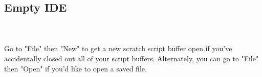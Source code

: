 


\subsection{Empty IDE}

\begin{minipage}{\linewidth}
        
        \label{fig:IDEempty} 
\end{minipage}

~\\~\\ 
Go to "File" then "New" to get a new scratch script buffer open if you've accidentally closed out all of your script buffers. Alternately, you can go to "File" then "Open" if you'd like to open a saved file. 












